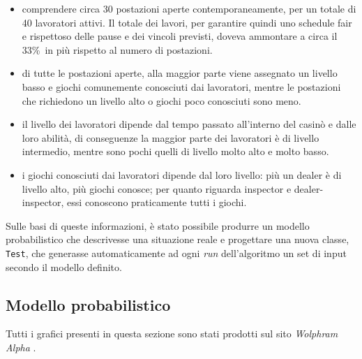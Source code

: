\begin{itemize}
    \item comprendere circa 30 postazioni aperte contemporaneamente, per un totale di 40 lavoratori attivi. Il totale dei lavori, per garantire quindi uno schedule fair e rispettoso delle pause e dei vincoli previsti, doveva ammontare a circa il 33\%\ in più rispetto al numero di postazioni.
    \item di tutte le postazioni aperte, alla maggior parte viene assegnato un livello basso e giochi comunemente conosciuti dai lavoratori, mentre le postazioni che richiedono un livello alto o giochi poco conosciuti sono meno.
    \item il livello dei lavoratori dipende dal tempo passato all'interno del casinò e dalle loro abilità, di conseguenze la maggior parte dei lavoratori è di livello intermedio, mentre sono pochi quelli di livello molto alto e molto basso.
    \item i giochi conosciuti dai lavoratori dipende dal loro livello: più un dealer è di livello alto, più giochi conosce; per quanto riguarda inspector e dealer-inspector, essi conoscono praticamente tutti i giochi.
\end{itemize}
Sulle basi di queste informazioni, è stato possibile produrre un modello probabilistico che descrivesse una situazione reale e progettare una nuova classe, \texttt{Test}, che generasse automaticamente ad ogni \textit{run} dell'algoritmo un set di input secondo il modello definito.

\subsection{Modello probabilistico}

Tutti i grafici presenti in questa sezione sono stati prodotti sul sito \textit{Wolphram Alpha} \cite{site:wolfram}.
